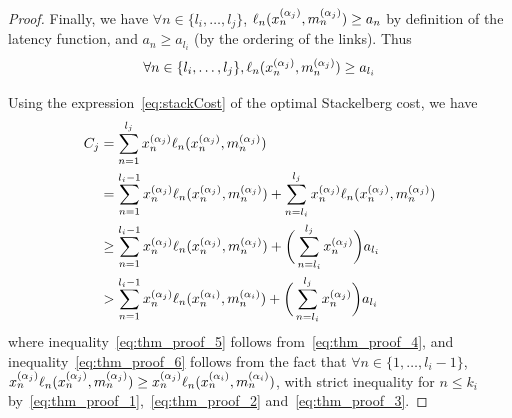 \begin{proof}
Finally, we have $\forall n \in \{l_i, \dots, l_j\}$, $\ell_n(x_n^{(\alpha_j)}, m_n^{(\alpha_j)}) \geq a_n$ by definition of the latency function, and $a_n \geq a_{l_i}$ (by the ordering of the links). Thus
\begin{equation}
\forall n \in \{l_i, \dots, l_j\}, \ell_n(x_n^{(\alpha_j)}, m_n^{(\alpha_j)}) \geq a_{l_i}
\label{eq:thm_proof_4}
\end{equation}

Using the expression~\eqref{eq:stackCost} of the optimal Stackelberg cost, we have
\begin{align}
C_j 
&= \sum_{n = 1}^{l_j} x_n^{(\alpha_j)} \ell_n(x_n^{(\alpha_j)}, m_n^{(\alpha_j)}) \notag \\
&= \sum_{n = 1}^{l_i-1} x_n^{(\alpha_j)} \ell_n(x_n^{(\alpha_j)}, m_n^{(\alpha_j)}) + 
\sum_{n = l_i}^{l_j} x_n^{(\alpha_j)} \ell_n(x_n^{(\alpha_j)}, m_n^{(\alpha_j)}) \notag \\
&\geq \sum_{n = 1}^{l_i-1} x_n^{(\alpha_j)} \ell_n(x_n^{(\alpha_j)}, m_n^{(\alpha_j)}) + 
\bigg(\sum_{n = l_i}^{l_j} x_n^{(\alpha_j)} \bigg) a_{l_i} \label{eq:thm_proof_5}\\
&> \sum_{n = 1}^{l_i-1} x_n^{(\alpha_j)} \ell_n(x_n^{(\alpha_i)}, m_n^{(\alpha_i)}) + 
\bigg(\sum_{n = l_i}^{l_j} x_n^{(\alpha_j)} \bigg) a_{l_i} \label{eq:thm_proof_6}
\end{align}
where inequality~\eqref{eq:thm_proof_5} follows from~\eqref{eq:thm_proof_4}, and inequality~\eqref{eq:thm_proof_6} follows from the fact that ${ \forall n \in \{1, \dots, l_i - 1\} }$,  ${ x_n^{(\alpha_j)}\ell_n(x_n^{(\alpha_j)}, m_n^{(\alpha_j)}) \geq x_n^{(\alpha_j)}\ell_n(x_n^{(\alpha_i)}, m_n^{(\alpha_i)}) }$, with strict inequality for $n \leq k_i$ by~\eqref{eq:thm_proof_1},~\eqref{eq:thm_proof_2} and~\eqref{eq:thm_proof_3}.


\end{proof}

